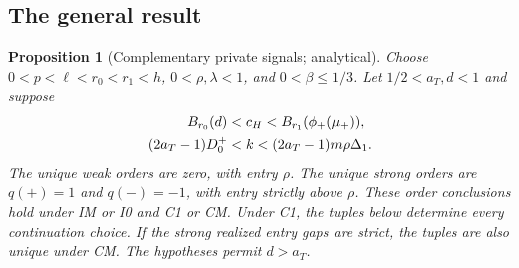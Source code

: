\documentclass[12pt]{article}
\newtheorem{proposition}{Proposition}
\begin{document}
\subsection{The general result}

\begin{proposition}[Complementary private signals; analytical]\label{prop:signals}
Choose $0<p<\ell<r_0<r_1<h$, $0<\rho,\lambda<1$, and $0<\beta\le1/3$.
Let $1/2<a_T,d<1$ and suppose
\begin{align}\label{eq:signalconditions}
 B_{r_0}(d)&<c_H<B_{r_1}(\phi_+(\mu_+)),\\
 (2a_T-1)D^+_0&<k<(2a_T-1)m\rho\Delta_1.\notag
\end{align}
The unique weak orders are zero, with entry $\rho$.
The unique strong orders are $q(+)=1$ and $q(-)=-1$, with entry strictly above $\rho$.
These order conclusions hold under IM or I0 and C1 or CM.
Under C1, the tuples below determine every continuation choice.
If the strong realized entry gaps are strict, the tuples are also unique under CM.
The hypotheses permit $d>a_T$.
\end{proposition}
\end{document}

